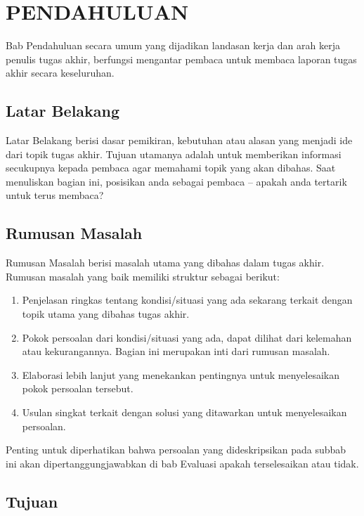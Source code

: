 \chapter{PENDAHULUAN}
\label{chapter:1}
\setcounter{page}{1}

Bab Pendahuluan secara umum yang dijadikan landasan kerja dan arah kerja penulis tugas akhir, berfungsi mengantar pembaca untuk membaca laporan tugas akhir secara keseluruhan.

\section{Latar Belakang}

Latar Belakang berisi dasar pemikiran, kebutuhan atau alasan yang menjadi ide dari topik tugas akhir. Tujuan utamanya adalah untuk memberikan informasi secukupnya kepada pembaca agar memahami topik yang akan dibahas.  Saat menuliskan bagian ini, posisikan anda sebagai pembaca – apakah anda tertarik untuk terus membaca?

\section{Rumusan Masalah}

Rumusan Masalah berisi masalah utama yang dibahas dalam tugas akhir. Rumusan masalah yang baik memiliki struktur sebagai berikut:

\begin{enumerate}
    \item Penjelasan ringkas tentang kondisi/situasi yang ada sekarang terkait dengan topik utama yang dibahas tugas akhir.
    \item Pokok persoalan dari kondisi/situasi yang ada, dapat dilihat dari kelemahan atau kekurangannya. Bagian ini merupakan inti dari rumusan masalah.
    \item Elaborasi lebih lanjut yang menekankan pentingnya untuk menyelesaikan pokok persoalan tersebut.
    \item Usulan singkat terkait dengan solusi yang ditawarkan untuk menyelesaikan persoalan.
\end{enumerate}

Penting untuk diperhatikan bahwa persoalan yang dideskripsikan pada subbab ini akan dipertanggungjawabkan di bab Evaluasi apakah terselesaikan atau tidak.

\section{Tujuan}

